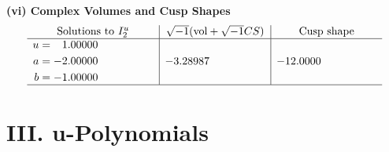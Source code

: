 \documentclass[1p]{elsarticle_modified}
\theoremstyle{definition}
\newcommand{\I}{\sqrt{-1}}
\begin{document}
\newpage\flushleft \textbf{(vi) Complex Volumes and Cusp Shapes}
$$\begin{array}{c|c|c}  
\text{Solutions to }I^u_{2}& \I (\text{vol} + \sqrt{-1}CS) & \text{Cusp shape}\\
 \hline 
\begin{aligned}
u &= \phantom{-}1.00000\phantom{ +0.000000I} \\
a &= -2.00000\phantom{ +0.000000I} \\
b &= -1.00000\phantom{ +0.000000I}\end{aligned}
 & -3.28987\phantom{ +0.000000I} & -12.0000\phantom{ +0.000000I}\\
 \hline 
 \end{array}$$\newpage
\newpage\renewcommand{\arraystretch}{1}
\centering \section*{ III. u-Polynomials}
\end{document}
